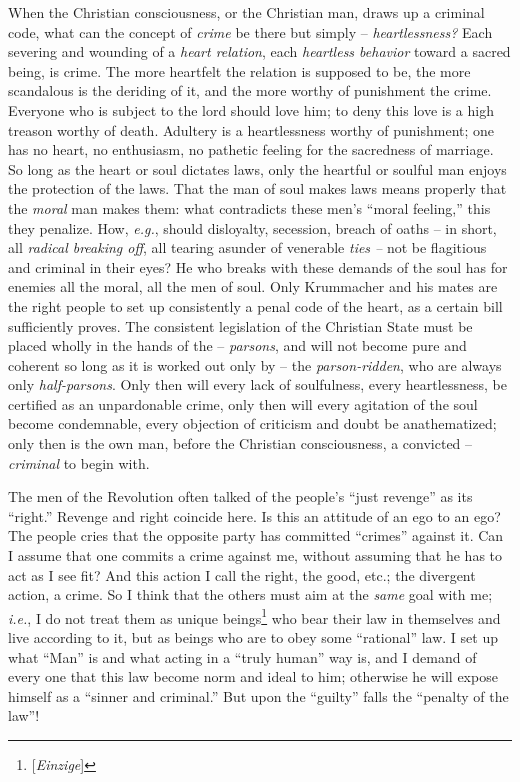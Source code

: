 \documentclass[12pt,a4paper]{book}
\begin{document}
When the Christian consciousness, or the Christian man, draws up a criminal 
code, what can the concept of \textit{crime} be there but simply -- 
\textit{heartlessness?} Each severing and wounding of a \textit{heart 
relation}, each \textit{heartless behavior} toward a sacred being, is crime. 
The more heartfelt the relation is supposed to be, the more scandalous is the 
deriding of it, and the more worthy of punishment the crime. Everyone who is 
subject to the lord should love him; to deny this love is a high treason 
worthy of death. Adultery is a heartlessness worthy of punishment; one has no 
heart, no enthusiasm, no pathetic feeling for the sacredness of marriage. So 
long as the heart or soul dictates laws, only the heartful or soulful man 
enjoys the protection of the laws. That the man of soul makes laws means 
properly that the \textit{moral} man makes them: what contradicts these men's 
``moral feeling,'' this they penalize. How, \textit{e.g.}, should 
disloyalty, secession, breach of oaths -- in short, all \textit{radical 
breaking off}, all tearing asunder of venerable \textit{ties --} not be 
flagitious and criminal in their eyes? He who breaks with these demands of the 
soul has for enemies all the moral, all the men of soul. Only Krummacher and 
his mates are the right people to set up consistently a penal code of the 
heart, as a certain bill sufficiently proves. The consistent legislation of 
the Christian State must be placed wholly in the hands of the -- 
\textit{parsons}, and will not become pure and coherent so long as it is 
worked out only by -- the \textit{parson-ridden}, who are always only 
\textit{half-parsons}. Only then will every lack of soulfulness, every 
heartlessness, be certified as an unpardonable crime, only then will every 
agitation of the soul become condemnable, every objection of criticism and 
doubt be anathematized; only then is the own man, before the Christian 
consciousness, a convicted -- \textit{criminal} to begin with.

The men of the Revolution often talked of the people's ``just revenge'' as 
its ``right.'' Revenge and right coincide here. Is this an attitude of an 
ego to an ego? The people cries that the opposite party has committed 
``crimes'' against it. Can I assume that one commits a crime against me, 
without assuming that he has to act as I see fit? And this action I call the 
right, the good, etc.; the divergent action, a crime. So I think that the 
others must aim at the \textit{same} goal with me; \textit{i.e.}, I do not 
treat them as unique beings\footnote{[\textit{Einzige}]} who bear their law in 
themselves and live according to it, but as beings who are to obey some 
``rational'' law. I set up what ``Man'' is and what acting in a ``truly 
human'' way is, and I demand of every one that this law become norm and ideal 
to him; otherwise he will expose himself as a ``sinner and criminal.'' But 
upon the ``guilty'' falls the ``penalty of the law''!
\end{document}
